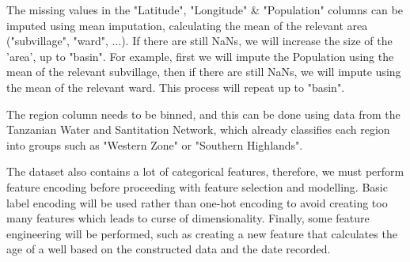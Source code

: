 \documentclass[twocolumn]{article}
\begin{document}
The missing values in the "Latitude", "Longitude" \& "Population" columns can be imputed using mean imputation, calculating the mean of the relevant area ("subvillage", "ward", ...). If there are still NaNs, we will increase the size of the 'area', up to "basin". For example, first we will impute the Population using the mean of the relevant subvillage, then if there are still NaNs, we will impute using the mean of the relevant ward. This process will repeat up to "basin".

The region column needs to be binned, and this can be done using data from the Tanzanian Water and Santitation Network, which already classifies each region into groups such as "Western Zone" or "Southern Highlands".

The dataset also contains a lot of categorical features, therefore, we must perform feature encoding before proceeding with feature selection and modelling. Basic label encoding will be used rather than one-hot encoding to avoid creating too many features which leads to curse of dimensionality. Finally, some feature engineering will be performed, such as creating a new feature that calculates the age of a well based on the constructed data and the date recorded.
\end{document}

